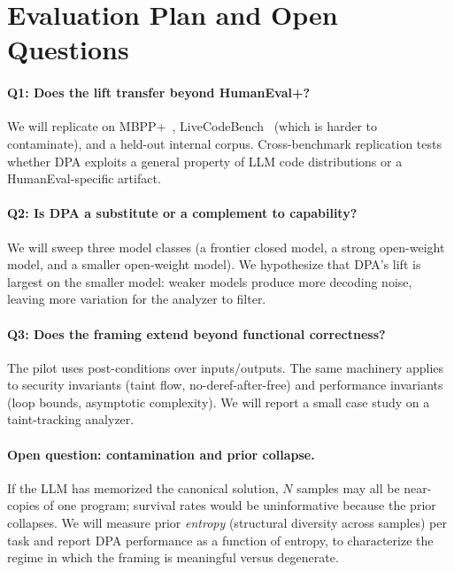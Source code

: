 \documentclass[sigconf,review,anonymous,nonacm]{acmart}
\begin{document}
\section{Evaluation Plan and Open Questions}
\label{sec:plan}

\paragraph{Q1: Does the lift transfer beyond HumanEval+?}
We will replicate on MBPP+~\cite{liu2023humanevalplus},
LiveCodeBench~\cite{jain2024livecodebench} (which is harder to
contaminate), and a held-out internal corpus. Cross-benchmark
replication tests whether DPA exploits a general property of LLM code
distributions or a HumanEval-specific artifact.

\paragraph{Q2: Is DPA a substitute or a complement to capability?}
We will sweep three model classes (a frontier closed model, a strong
open-weight model, and a smaller open-weight model). We hypothesize
that DPA's lift is largest on the smaller model: weaker models produce
more decoding noise, leaving more variation for the analyzer to filter.

\paragraph{Q3: Does the framing extend beyond functional correctness?}
The pilot uses post-conditions over inputs/outputs. The same machinery
applies to security invariants (taint flow, no-deref-after-free) and
performance invariants (loop bounds, asymptotic complexity). We will
report a small case study on a taint-tracking analyzer.

\paragraph{Open question: contamination and prior collapse.}
If the LLM has memorized the canonical solution, $N$ samples may all be
near-copies of one program; survival rates would be uninformative
because the prior collapses. We will measure prior \emph{entropy}
(structural diversity across samples) per task and report DPA
performance as a function of entropy, to characterize the regime in
which the framing is meaningful versus degenerate.
\end{document}
